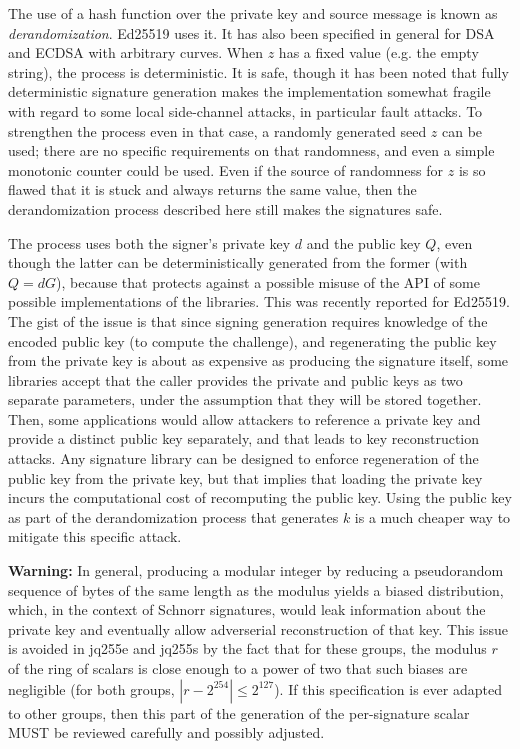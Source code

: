 \documentclass{llncs}
\begin{document}
The use of a hash function over the private key and source message is
known as \emph{derandomization}.
Ed25519\cite{BerDuiLanSchYan2012,EdDSArfc8032} uses it. It has also been
specified in general for DSA and ECDSA with arbitrary
curves\cite{DeterministicECDSArfc}. When $z$ has a fixed value (e.g. the
empty string), the process is deterministic. It is safe, though it has
been noted that fully deterministic signature generation makes the
implementation somewhat fragile with regard to some local side-channel
attacks, in particular fault
attacks\cite{AmbBosFayJoyLocMur2017,PodSomSchLocRos2018}. To strengthen
the process even in that case, a randomly generated seed $z$ can be
used; there are no specific requirements on that randomness, and even a
simple monotonic counter could be used. Even if the source of randomness
for $z$ is so flawed that it is stuck and always returns the same value,
then the derandomization process described here still makes the
signatures safe.

The process uses both the signer's private key $d$ and the public key
$Q$, even though the latter can be deterministically generated from the
former (with $Q = dG$), because that protects against a possible misuse
of the API of some possible implementations of the libraries. This was
recently reported for Ed25519\cite{Cha2022}. The gist of the issue is
that since signing generation requires knowledge of the encoded public
key (to compute the challenge), and regenerating the public key from the
private key is about as expensive as producing the signature itself,
some libraries accept that the caller provides the private and public
keys as two separate parameters, under the assumption that they will be
stored together. Then, some applications would allow attackers to
reference a private key and provide a distinct public key separately,
and that leads to key reconstruction attacks. Any signature library can
be designed to enforce regeneration of the public key from the private
key, but that implies that loading the private key incurs the
computational cost of recomputing the public key. Using the public key
as part of the derandomization process that generates $k$ is a much
cheaper way to mitigate this specific attack.

\noindent\textsf{\textbf{Warning:}} In general, producing a modular
integer by reducing a pseudorandom sequence of bytes of the same length
as the modulus yields a biased distribution, which, in the context of
Schnorr signatures, would leak information about the private key and
eventually allow adverserial reconstruction of that key. This issue is
avoided in jq255e and jq255s by the fact that for these groups, the
modulus $r$ of the ring of scalars is close enough to a power of two
that such biases are negligible (for both groups,
$|r - 2^{254}|\leq 2^{127}$). If this specification is ever adapted to
other groups, then this part of the generation of the per-signature
scalar MUST be reviewed carefully and possibly adjusted.
\end{document}

